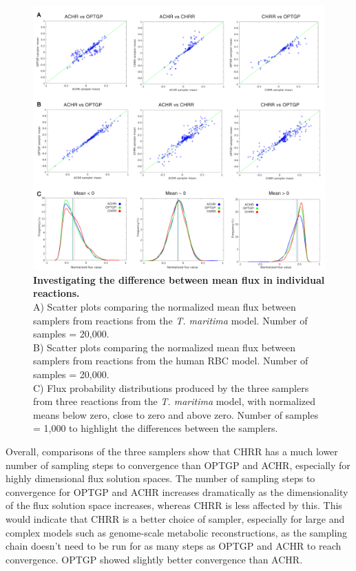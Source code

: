 \documentclass[10pt,letterpaper]{article}
\begin{document}
\begin{figure}[!ht]
\centering
	\includegraphics[scale=0.32]{fig7.png}
	\caption{\textbf{Investigating the difference between mean flux in individual reactions.}\\
A) Scatter plots comparing the normalized mean flux between samplers from reactions from the \textit{T. maritima} model. Number of samples = 20,000. \\ B) Scatter plots comparing the normalized mean flux between samplers from reactions from the human RBC model.  Number of samples = 20,000. \\ C) Flux probability distributions produced by the three samplers from three reactions from the \textit{T. maritima} model, with normalized means below zero, close to zero and above zero. Number of samples = 1,000 to highlight the differences between the samplers.
}
\label{figure:7}
\end{figure}

Overall, comparisons of the three samplers show that CHRR has a much lower number of sampling steps to convergence than OPTGP and ACHR, especially for highly dimensional flux solution spaces. The number of sampling steps to convergence for OPTGP and ACHR increases dramatically as the dimensionality of the flux solution space increases, whereas CHRR is less affected by this. This would indicate that CHRR is a better choice of sampler, especially for large and complex models such as genome-scale metabolic reconstructions, as the sampling chain doesn’t need to be run for as many steps as OPTGP and ACHR to reach convergence. OPTGP showed slightly better convergence than ACHR.
\end{document}
